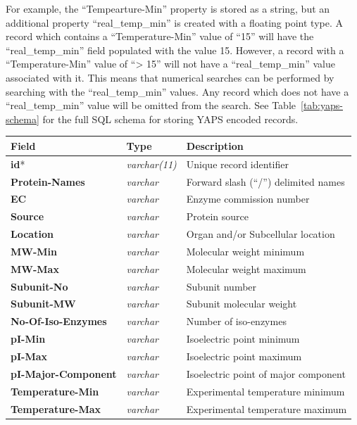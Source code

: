 \newpage
For example, the ``Tempearture-Min'' property is stored as a string,
but an additional property ``real\_temp\_min'' is created with a
floating point type. A record which contains a ``Temperature-Min''
value of ``15'' will have the ``real\_temp\_min'' field populated with
the value 15. However, a record with a ``Temperature-Min'' value of
``> 15'' will not have a ``real\_temp\_min'' value associated with
it. This means that numerical searches can be performed by searching
with the ``real\_temp\_min'' values. Any record which does not have a
``real\_temp\_min'' value will be omitted from the search. See
Table~\ref{tab:yaps-schema} for the full SQL schema for storing YAPS
encoded records.


\begin{table}[H]
\centering
\begin{tabular}{| l | l | l |}
\hline
\textbf{Field} & \textbf{Type} & \textbf{Description}\\
\hline
\textbf{id}* & \textit{varchar(11)} & Unique record identifier\\
\textbf{Protein-Names} & \textit{varchar} & Forward slash (``/'') delimited names\\
\textbf{EC} & \textit{varchar} & Enzyme commission number\\
\textbf{Source} & \textit{varchar} & Protein source\\
\textbf{Location} & \textit{varchar} & Organ and/or Subcellular location\\
\textbf{MW-Min} & \textit{varchar} & Molecular weight minimum\\
\textbf{MW-Max} & \textit{varchar} & Molecular weight maximum\\
\textbf{Subunit-No} & \textit{varchar} & Subunit number\\
\textbf{Subunit-MW} & \textit{varchar} & Subunit molecular weight\\
\textbf{No-Of-Iso-Enzymes} & \textit{varchar} & Number of iso-enzymes\\
\textbf{pI-Min} & \textit{varchar} & Isoelectric point minimum\\
\textbf{pI-Max} & \textit{varchar} & Isoelectric point maximum\\
\textbf{pI-Major-Component} & \textit{varchar} & Isoelectric point of major component\\
\textbf{Temperature-Min} & \textit{varchar} & Experimental temperature minimum\\
\textbf{Temperature-Max} & \textit{varchar} & Experimental temperature maximum\\

\end{tabular}
\end{table}

